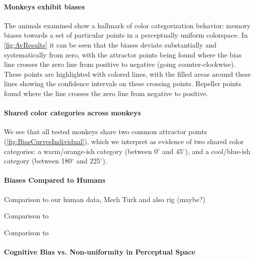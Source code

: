 \paragraph{Monkeys exhibit biases} %

The animals examined show a hallmark of color categorization behavior: memory biases towards a set of particular points in a perceptually uniform colorspace.
In \autoref{fig:AvResults} it can be seen that the biases deviate substantially and systematically from zero, with the attractor points being found where the bias line crosses the zero line from positive to negative (going counter-clockwise). These points are highlighted with colored lines, with the filled areas around these lines showing the confidence intervals on these crossing points. Repeller points found where the line crosses the zero line from negative to positive.



\paragraph{Shared color categories across monkeys}

We see that all tested monkeys share two common attractor points (\autoref{fig:BiasCurvesIndividual}), which we interpret as evidence of two shared color categories: a warm/orange-ish category (between 0$^\circ$ and 45$^\circ$), and a cool/blue-ish category (between 180$^\circ$ and 225$^\circ$). 



\paragraph{Biases Compared to Humans}

Comparison to our human data, Mech Turk and also rig (maybe?)

Comparison to \cite{bae_why_2015}

Comparison to \cite{panichello_error-correcting_2019}

\paragraph{Cognitive Bias vs. Non-uniformity in Perceptual Space}



